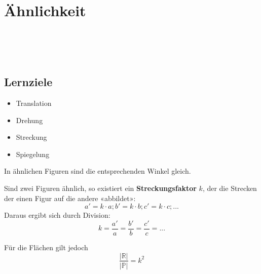 
\section{Ähnlichkeit}
\\
\\
\\

\subsection*{Lernziele}

\begin{itemize}
\item Translation
\item Drehung
\item Streckung
\item Spiegelung
\end{itemize}


In ähnlichen Figuren sind die entsprechenden Winkel gleich.

Sind zwei Figuren ähnlich, so existiert ein \textbf{Streckungsfaktor}
$k$, der die Strecken der einen Figur auf die andere «abbildet»:
$$a' = k\cdot{}a; b' = k\cdot{}b; c' = k\cdot{} c; ...$$
Daraus ergibt sich durch Division:
$$k = \frac{a'}{a} = \frac{b'}{b} = \frac{c'}{c} = ...$$

Für die Flächen gilt jedoch
$$\frac{|\mathbb{R}|}{|\mathbb{P}|} = k^2$$




